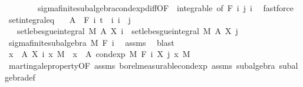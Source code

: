 \begin{isabellebody}
\ \ \ \ \ \ \ \ sigma{\isacharunderscore}{\kern0pt}finite{\isacharunderscore}{\kern0pt}subalgebra{\isachardot}{\kern0pt}cond{\isacharunderscore}{\kern0pt}exp{\isacharunderscore}{\kern0pt}diff{\isacharbrackleft}{\kern0pt}OF\ {\isacharunderscore}{\kern0pt}\ integrable{\isacharparenleft}{\kern0pt}{}{\isacharcomma}{\kern0pt}{}{\isacharparenright}{\kern0pt}{\isacharcomma}{\kern0pt}\ of\ {\isachardoublequoteopen}F\ i{\isachardoublequoteclose}\ j\ i{\isacharbrackright}{\kern0pt}\ \isamarkupfalse%
\ fastforce%
\endisatagproof
{\isafoldproof}%
%
\isadelimproof
\isanewline
%
\endisadelimproof
\isanewline
{}\isamarkupfalse%
\ set{\isacharunderscore}{\kern0pt}integral{\isacharunderscore}{\kern0pt}eq{\isacharcolon}{\kern0pt}\isanewline
\ \ \ {\isachardoublequoteopen}A\ {\isasymin}\ F\ i{\isachardoublequoteclose}\ {\isachardoublequoteopen}t\ {\isasymle}\ i{\isachardoublequoteclose}\ {\isachardoublequoteopen}i\ {\isasymle}\ j{\isachardoublequoteclose}\isanewline
\ \ \ {\isachardoublequoteopen}set{\isacharunderscore}{\kern0pt}lebesgue{\isacharunderscore}{\kern0pt}integral\ M\ A\ {\isacharparenleft}{\kern0pt}X\ i{\isacharparenright}{\kern0pt}\ {\isacharequal}{\kern0pt}\ set{\isacharunderscore}{\kern0pt}lebesgue{\isacharunderscore}{\kern0pt}integral\ M\ A\ {\isacharparenleft}{\kern0pt}X\ j{\isacharparenright}{\kern0pt}{\isachardoublequoteclose}\isanewline
%
\isadelimproof
%
\endisadelimproof
%
\isatagproof
{}\isamarkupfalse%
\ {\isacharminus}{\kern0pt}\isanewline
\ \ \isamarkupfalse%
\ sigma{\isacharunderscore}{\kern0pt}finite{\isacharunderscore}{\kern0pt}subalgebra\ M\ {\isachardoublequoteopen}F\ i{\isachardoublequoteclose}\ \isamarkupfalse%
\ assms{\isacharparenleft}{\kern0pt}{}{\isacharparenright}{\kern0pt}\ \isamarkupfalse%
\ blast\isanewline
\ \ \isamarkupfalse%
\ {\isachardoublequoteopen}{\isasymintegral}x\ {\isasymin}\ A{\isachardot}{\kern0pt}\ X\ i\ x\ {\isasympartial}M\ {\isacharequal}{\kern0pt}\ {\isasymintegral}x\ {\isasymin}\ A{\isachardot}{\kern0pt}\ cond{\isacharunderscore}{\kern0pt}exp\ M\ {\isacharparenleft}{\kern0pt}F\ i{\isacharparenright}{\kern0pt}\ {\isacharparenleft}{\kern0pt}X\ j{\isacharparenright}{\kern0pt}\ x\ {\isasympartial}M{\isachardoublequoteclose}\ \isamarkupfalse%
\ martingale{\isacharunderscore}{\kern0pt}property{\isacharbrackleft}{\kern0pt}OF\ assms{\isacharparenleft}{\kern0pt}{}{\isacharcomma}{\kern0pt}{}{\isacharparenright}{\kern0pt}{\isacharbrackright}{\kern0pt}\ borel{\isacharunderscore}{\kern0pt}measurable{\isacharunderscore}{\kern0pt}cond{\isacharunderscore}{\kern0pt}exp{\isacharprime}{\kern0pt}\ assms\ subalgebra\ subalgebra{\isacharunderscore}{\kern0pt}def\ \isamarkupfalse%

\end{isabellebody}
